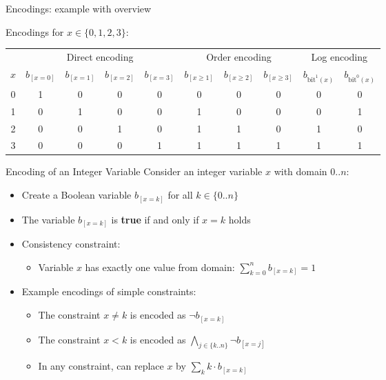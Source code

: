 \documentclass{cons-beamer}
\begin{document}
\begin{frame}{Encodings: example with overview}
	
	Encodings for $x \in \{0,1,2,3\}$:
	
	\centering
	\begin{table}[h!]
		\small
		\centering
		\renewcommand{\arraystretch}{1.2}
		\begin{tabular}{c|cccc|ccc|cc}
			& \multicolumn{4}{c|}{Direct encoding} & \multicolumn{3}{c|}{Order encoding} & \multicolumn{2}{c}{Log encoding} \\ 
			$x$ & $b_{[x=0]}$ & $b_{[x=1]}$ & $b_{[x=2]}$ & $b_{[x=3]}$ & $b_{[x \ge 1]}$ & $b_{[x \ge 2]}$ & $b_{[x \ge 3]}$ & $b_{\text{bit}^1(x)}$ & $b_{\text{bit}^0(x)}$ \\ \hline
			0 & 1 & 0 & 0 & 0 & 0 & 0 & 0 & 0 & 0 \\
			1 & 0 & 1 & 0 & 0 & 1 & 0 & 0 & 0 & 1 \\
			2 & 0 & 0 & 1 & 0 & 1 & 1 & 0 & 1 & 0 \\
			3 & 0 & 0 & 0 & 1 & 1 & 1 & 1 & 1 & 1 \\
		\end{tabular}
	\end{table}
\end{frame}

\begin{frame}{ Encoding of an Integer Variable}
  Consider an integer variable $x$ with domain $0..n$: \vfill
  \begin{itemize}
    \item Create a Boolean variable $b_{[x=k]}$ for all $k \in \{0..n\}$
      \vfill
    \item The variable $b_{[x=k]}$ is \textbf{true} if and only if
      $x = k$ holds \vfill
    \item Consistency constraint: \vfill
      \begin{itemize}
          \item Variable $x$ has exactly one value from domain: $\sum_{k=0}^n b_{[x=k]} = 1$
      \end{itemize} \vfill
    \item Example encodings of simple constraints:
      \begin{itemize}
        \item The constraint $x \neq k$ is encoded as $\lnot b_{[x=k]}$
          \vfill
        \item The constraint $x < k$ is encoded as
          $\bigwedge_{j \in \{k..n\}} \lnot b_{[x=j]}$
          \vfill
        \item In any constraint, can replace $x$ by $\sum_k k \cdot b_{[x=k]}$
      \end{itemize}
  \end{itemize}
\end{frame}
\end{document}
